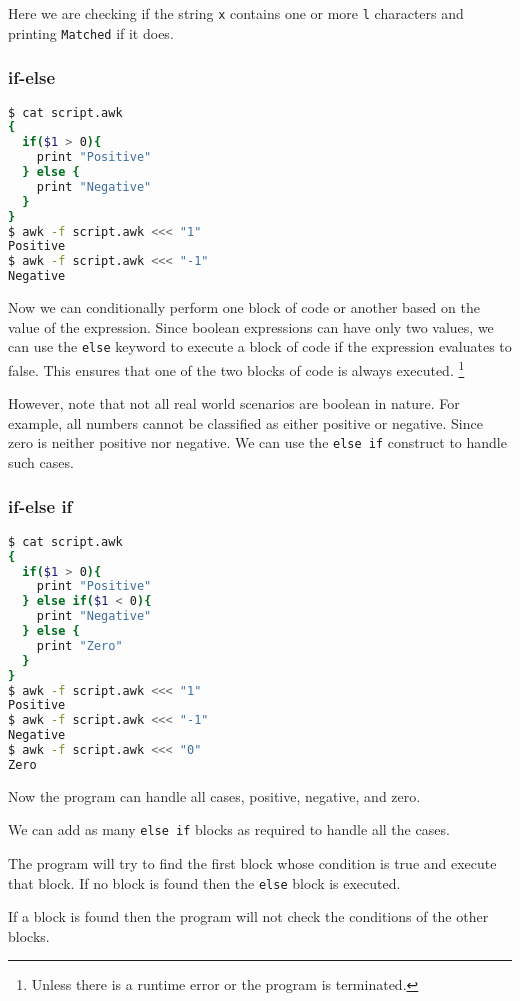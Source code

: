 Here we are checking if the string \lstinline|x| contains one or more \lstinline|l| characters and printing \lstinline|Matched| if it does.

\subsubsection{if-else}

\begin{lstlisting}[language=bash]
$ cat script.awk
{
  if($1 > 0){
    print "Positive"
  } else {
    print "Negative"
  }
}
$ awk -f script.awk <<< "1"
Positive
$ awk -f script.awk <<< "-1"
Negative
\end{lstlisting}

Now we can conditionally perform one block of code or another based on the value of the expression.
Since boolean expressions can have only two values, we can use the \lstinline|else| keyword to execute a block of code if the expression evaluates to false.
This ensures that one of the two blocks of code is always executed.
\footnote{
  Unless there is a runtime error or the program is terminated.
}

However, note that not all real world scenarios are boolean in nature. For example, all numbers cannot be classified as either positive or negative. Since zero is neither positive nor negative. We can use the \lstinline|else if| construct to handle such cases.

\subsubsection{if-else if}

\begin{lstlisting}[language=bash]
$ cat script.awk
{
  if($1 > 0){
    print "Positive"
  } else if($1 < 0){
    print "Negative"
  } else {
    print "Zero"
  }
}
$ awk -f script.awk <<< "1"
Positive
$ awk -f script.awk <<< "-1"
Negative
$ awk -f script.awk <<< "0"
Zero
\end{lstlisting}

Now the program can handle all cases, positive, negative, and zero.

We can add as many \lstinline|else if| blocks as required to handle all the cases.

The program will try to find the first block whose condition is true and execute that block. If no block is found then the \lstinline|else| block is executed.

If a block is found then the program will not check the conditions of the other blocks.

